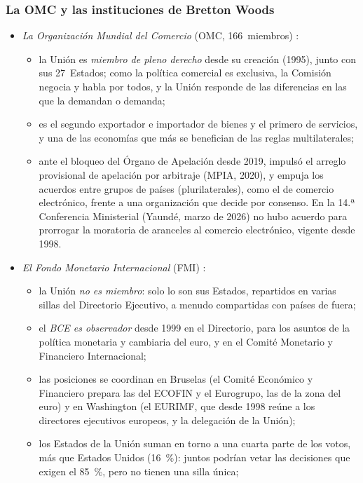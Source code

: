 \documentclass[11pt]{article}
\begin{document}
\subsubsection{La OMC y las instituciones de Bretton Woods}\label{sec:org-bretton}

\begin{itemize}
\item \emph{La Organización Mundial del Comercio} (OMC, 166~miembros) :
  \begin{itemize}
  \item la Unión es \emph{miembro de pleno derecho} desde su creación (1995), junto con sus 27~Estados; como la política comercial es exclusiva, la Comisión negocia y habla por todos, y la Unión responde de las diferencias en las que la demandan o demanda;
  \item es el segundo exportador e importador de bienes y el primero de servicios, y una de las economías que más se benefician de las reglas multilaterales;
  \item ante el bloqueo del Órgano de Apelación desde 2019, impulsó el arreglo provisional de apelación por arbitraje (MPIA, 2020), y empuja los acuerdos entre grupos de países (plurilaterales), como el de comercio electrónico, frente a una organización que decide por consenso. En la 14.ª Conferencia Ministerial (Yaundé, marzo de 2026) no hubo acuerdo para prorrogar la moratoria de aranceles al comercio electrónico, vigente desde 1998\nocite{USTR2026MC14}.
  \end{itemize}
\item \emph{El Fondo Monetario Internacional} (FMI) :
  \begin{itemize}
  \item la Unión \emph{no es miembro}: solo lo son sus Estados, repartidos en varias sillas del Directorio Ejecutivo, a menudo compartidas con países de fuera;
  \item el \emph{BCE es observador} desde 1999 en el Directorio, para los asuntos de la política monetaria y cambiaria del euro, y en el Comité Monetario y Financiero Internacional;
  \item las posiciones se coordinan en Bruselas (el Comité Económico y Financiero prepara las del ECOFIN y el Eurogrupo, las de la zona del euro) y en Washington (el EURIMF, que desde 1998 reúne a los directores ejecutivos europeos, y la delegación de la Unión);
  \item los Estados de la Unión suman en torno a una cuarta parte de los votos, más que Estados Unidos (16~\%): juntos podrían vetar las decisiones que exigen el 85~\%, pero no tienen una silla única;

\end{itemize}
\end{itemize}
\end{document}
